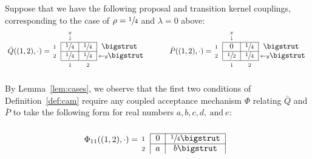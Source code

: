 \documentclass[aihp]{imsart}
\theoremstyle{plain}
\theoremstyle{remark}
\theoremstyle{definition} \newtheorem{example}{Example}
\newcommand{\eq}[1]{\begin{align*}#1\end{align*}} %
\newcommand{\cd}{\cdot}
\newcommand{\sas}{\ \text{and} \ }
\newcommand{\bp}{\bar P}
\newcommand{\bq}{\bar Q}
\newcommand{\h}{\sfrac{1}{2}}
\begin{document}
\begin{appendix}
Suppose that we have the following proposal and transition kernel
couplings, corresponding to the case of $\rho = \sfrac{1}{4}$ and $\lambda = 0$ above:
\eq{ \raisebox{3pt}{ $ \bq((1,2), \cd)
		= $ } \hspace{-5pt}
	\begin{blockarray}{rccl}
		& {\stackrel{x}{\scriptstyle \downarrow}} & &  \\
		\begin{block}{ r |c|c| l }
			\cline{2-3}
			{\scriptstyle 1}  & \sfrac{1}{4} & \sfrac{1}{4} & \bigstrut \\
			\cline{2-3}
			{\scriptstyle 2} &\sfrac{1}{4} & \sfrac{1}{4} & {\hspace{-4pt} \scriptstyle \leftarrow y}  \bigstrut  \\
			\cline{2-3}
		\end{block}
		\  & {\scriptstyle 1} & {\scriptstyle 2}
	\end{blockarray}
	\hspace{2.5em}
	\raisebox{3pt}{ $ \bp((1,2), \cd) = $ } \hspace{-5pt}
	\begin{blockarray}{rccl}
		& {\stackrel{x}{\scriptstyle \downarrow}} & &  \\
		\begin{block}{ r |c|c| l }
			\cline{2-3}
			{\scriptstyle 1}  & 0 & \sfrac{1}{4} &  \bigstrut  \\
			\cline{2-3}
			{\scriptstyle 2} &\h & \sfrac{1}{4} & {\hspace{-4pt} \scriptstyle \leftarrow y}  \bigstrut  \\
			\cline{2-3}
		\end{block}
		\  & {\scriptstyle 1} & {\scriptstyle 2}
	\end{blockarray}
}
By Lemma~\ref{lem:cases}, we observe that the first two conditions of Definition~\ref{def:cam}
require any coupled acceptance mechanism $\Phi$ relating $\bq$ and $\bp$ to take the following form
for real numbers $a, b, c, d, \sas e$:
\begin{alignat*}{2}
	& \raisebox{3pt}{ $ \Phi_{11}((1,2), \cd) = $ } \hspace{-5pt}
	\begin{blockarray}{rcc} \\
		\begin{block}{ r |c|c| }
			\cline{2-3}
			{\scriptstyle 1}  &  0 & \sfrac{1}{4} \bigstrut \\
			\cline{2-3}
			{\scriptstyle 2} & a & b \bigstrut  \\

\end{block}
\end{blockarray}
\end{alignat*}
\end{appendix}
\end{document}
